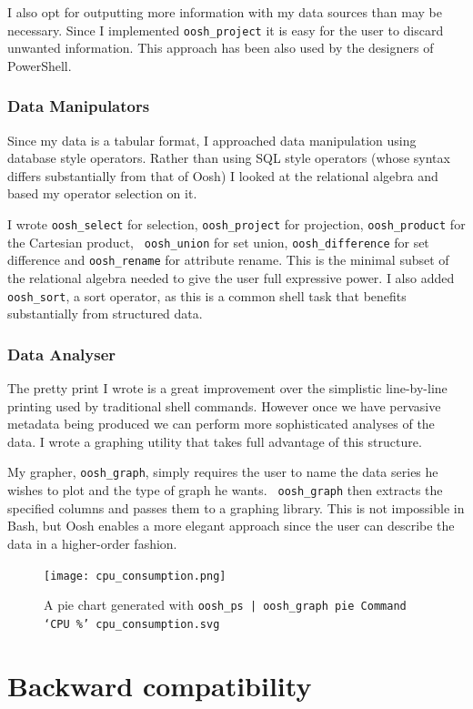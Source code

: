 \documentclass[12pt,twoside,notitlepage]{report}
\begin{document}
I also opt for outputting more information with my data sources than
may be necessary. Since I implemented {\tt oosh\_project} it is easy
for the user to discard unwanted information. This approach has been
also used by the designers of PowerShell.

\subsubsection{Data Manipulators}
Since my data is a tabular format, I approached data manipulation
using database style operators. Rather than using SQL style operators
(whose syntax differs substantially from that of Oosh) I looked at the
relational algebra and based my operator selection on it.

I wrote {\tt oosh\_select} for selection, {\tt oosh\_project} for
projection, {\tt oosh\_product} for the Cartesian product, {\tt
  oosh\_union} for set union, {\tt oosh\_difference} for set
difference and {\tt oosh\_rename} for attribute rename. This is the
minimal subset of the relational algebra needed to give the user full
expressive power. I also added {\tt oosh\_sort}, a sort operator, as
this is a common shell task that benefits substantially from
structured data.

\subsubsection{Data Analyser}
The pretty print I wrote is a great improvement over the simplistic
line-by-line printing used by traditional shell commands. However once
we have pervasive metadata being produced we can perform more
sophisticated analyses of the data. I wrote a graphing utility that
takes full advantage of this structure.

My grapher, {\tt oosh\_graph}, simply requires the user to name the
data series he wishes to plot and the type of graph he wants. {\tt
  oosh\_graph} then extracts the specified columns and passes them to
a graphing library. This is not impossible in Bash, but Oosh enables a
more elegant approach since the user can describe the data in a
higher-order fashion.

\begin{figure}[h]
  \centering
  \texttt{[image: cpu\_consumption.png]}
  \caption{A pie chart generated with {\tt oosh\_ps | oosh\_graph pie Command `CPU \%' cpu\_consumption.svg}}
\end{figure}

\section{Backward compatibility}
\end{document}

